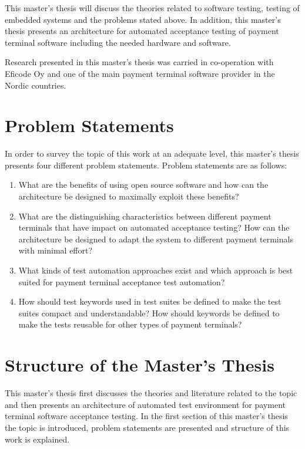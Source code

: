 This master's thesis will discuss the theories related to software testing, testing of embedded systems and the problems stated above. In addition, this master's thesis presents an architecture for automated acceptance testing of payment terminal software including the needed hardware and software.

Research presented in this master's thesis was carried in co-operation with Eficode Oy and one of the main payment terminal software provider in the Nordic countries.

\section{Problem Statements}

In order to survey the topic of this work at an adequate level, this master's thesis presents four different problem statements. Problem statements are as follows:
\begin{enumerate}
\item What are the benefits of using open source software and how can the architecture be designed to maximally exploit these benefits?
\item What are the distinguishing characteristics between different payment terminals that have impact on automated acceptance testing? How can the architecture be designed to adapt the system to different payment terminals with minimal effort?
\item What kinds of test automation approaches exist and which approach is best suited for payment terminal acceptance test automation?
\item How should test keywords used in test suites be defined to make
the test suites compact and understandable? How should keywords be defined to make the tests reusable for other types of payment terminals?
\end{enumerate}

\section{Structure of the Master's Thesis}
\label{section:structure} 

This master's thesis first discusses the theories and literature related to the topic and then presents an architecture of automated test environment for payment terminal software acceptance testing. In the first section of this master's thesis the topic is introduced, problem statements are presented and structure of this work is explained.

